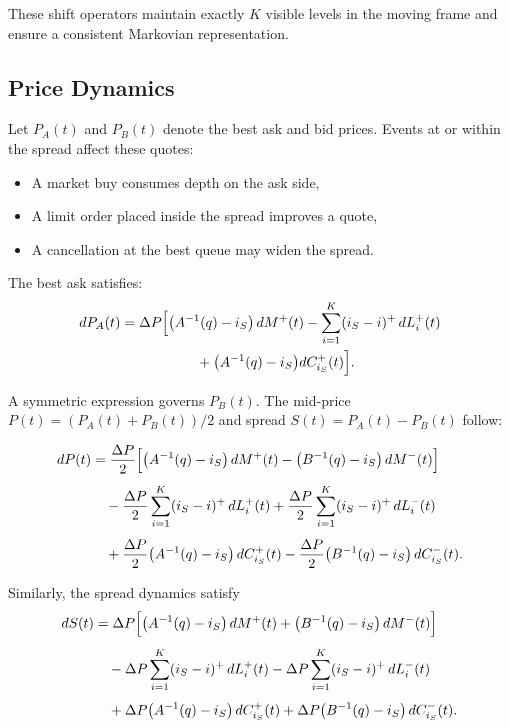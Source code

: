 These shift operators maintain exactly \(K\) visible levels in the moving frame and ensure a
consistent Markovian representation.

\subsection{Price Dynamics}

Let \(P_A(t)\) and \(P_B(t)\) denote the best ask and bid prices.  
Events at or within the spread affect these quotes:

\begin{itemize}
    \item A market buy consumes depth on the ask side,
    \item A limit order placed inside the spread improves a quote,
    \item A cancellation at the best queue may widen the spread.
\end{itemize}

The best ask satisfies:
\begin{align}
dP_A(t)
= \Delta P \Bigl[
&\bigl(A^{-1}(q)-i_S\bigr)\, dM^+(t)
-
\sum_{i=1}^K (i_S - i)^{+}\, dL^+_i(t)
\\
&\qquad
+\bigl(A^{-1}(q)-i_S\bigr) dC^+_{i_S}(t)
\Bigr].
\end{align}

A symmetric expression governs \(P_B(t)\).  
The mid-price \(P(t) = (P_A(t)+P_B(t))/2\) and spread \(S(t)=P_A(t)-P_B(t)\) follow:

\begin{align}
dP(t)
&= 
\frac{\Delta P}{2}
\Bigl[
\bigl(A^{-1}(q)-i_S\bigr)\, dM^+(t)
-
\bigl(B^{-1}(q)-i_S\bigr)\, dM^-(t)
\Bigr]
\notag\\[4pt]
&\quad
-
\frac{\Delta P}{2}
\sum_{i=1}^K (i_S - i)^{+}\, dL^+_i(t)
+
\frac{\Delta P}{2}
\sum_{i=1}^K (i_S - i)^{+}\, dL^-_i(t)
\notag\\[4pt]
&\quad
+
\frac{\Delta P}{2}
\bigl(A^{-1}(q)-i_S \bigr)\, dC^+_{i_S}(t)
-
\frac{\Delta P}{2}
\bigl(B^{-1}(q)-i_S \bigr)\, dC^-_{i_S}(t).
\end{align}

Similarly, the spread dynamics satisfy
\begin{align}
dS(t)
&=
\Delta P
\Bigl[
\bigl(A^{-1}(q)-i_S\bigr)\, dM^+(t)
+
\bigl(B^{-1}(q)-i_S\bigr)\, dM^-(t)
\Bigr]
\notag\\[4pt]
&\quad
-
\Delta P
\sum_{i=1}^K (i_S - i)^{+}\, dL^+_i(t)
-
\Delta P
\sum_{i=1}^K (i_S - i)^{+}\, dL^-_i(t)
\notag\\[4pt]
&\quad
+
\Delta P
\bigl(A^{-1}(q)-i_S \bigr)\, dC^+_{i_S}(t)
+
\Delta P
\bigl(B^{-1}(q)-i_S \bigr)\, dC^-_{i_S}(t).
\end{align}

